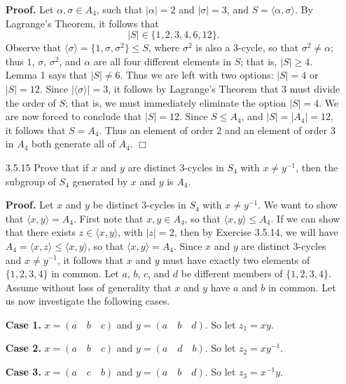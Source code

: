 \documentclass[9pt]{article}
\newcommand{\qed}{\hfill \ensuremath{\Box}}
\newcommand{\cyc}[1]{\langle #1 \rangle}
\begin{document}
\begin{enumerate}
      \textbf{Proof.} Let $\alpha, \sigma \in A_4$, such that $|\alpha| = 2$
      and $|\sigma| = 3$, and $S = \cyc{\alpha, \sigma}$. By Lagrange's
      Theorem, it follows that
      $$|S| \in \{1, 2, 3, 4, 6, 12\}.$$
      Observe that $\cyc{\sigma} = \{1, \sigma, \sigma^2\} \le S$, where
      $\sigma^2$ is also a 3-cycle, so that $\sigma^2 \neq \alpha$; thus $1$,
      $\sigma$, $\sigma^2$, and $\alpha$ are all four different elements in $S$;
      that is, $|S| \ge 4$. Lemma 1 says that $|S| \neq 6$. Thus we are left
      with two options: $|S| = 4$ or $|S| = 12$. Since $|\cyc{\sigma}| = 3$, it
      follows by Lagrange's Theorem that $3$ must divide the order of $S$; that
      is, we must immediately eliminate the option $|S| = 4$. We are now forced
      to conclude that $|S| = 12$. Since $S \le A_4$, and $|S| = |A_4| = 12$, it
      follows that $S = A_4$. Thus an element of order 2 and an element of order
      3 in $A_4$ both generate all of $A_4$. \qed
   \item[3.5.15]  Prove that if $x$ and $y$ are distinct 3-cycles in $S_4$ with
                  $x \neq y^{-1}$, then the subgroup of $S_4$ generated by $x$
                  and $y$ is $A_4$.
                  
      \textbf{Proof.} Let $x$ and $y$ be distinct 3-cycles in $S_4$ with
      $x \neq y^{-1}$. We want to show that $\cyc{x, y} = A_4$. First note that
      $x, y \in A_4$, so that $\cyc{x, y} \le A_4$. If we can show that there
      exists $z \in \cyc{x, y}$, with $|z| = 2$, then by Exercise
      3.5.14, we will have $A_4 = \cyc{x, z} \le \cyc{x, y}$, so that
      $\cyc{x, y} = A_4$. Since $x$ and $y$ are distinct 3-cycles and
      $x \neq y^{-1}$, it follows that $x$ and $y$ must have exactly two
      elements of $\{1, 2, 3, 4\}$ in common. Let $a$, $b$, $c$, and $d$ be
      different members of $\{1, 2, 3, 4\}$. Assume without loss of generality
      that $x$ and $y$ have $a$ and $b$ in common. Let us now investigate the
      following cases. 
      
      \textbf{Case 1.} $x = (a \quad b \quad c)$ and $y = (a \quad b \quad d)$.
      So let $z_1 = xy$.
      
      \textbf{Case 2.} $x = (a \quad b \quad c)$ and $y = (a \quad d \quad b)$.      
      So let $z_2 = xy^{-1}$.
      
      \textbf{Case 3.} $x = (a \quad c \quad b)$ and $y = (a \quad b \quad d)$.      
      So let $z_3 = x^{-1}y$.
      

\end{enumerate}
\end{document}
